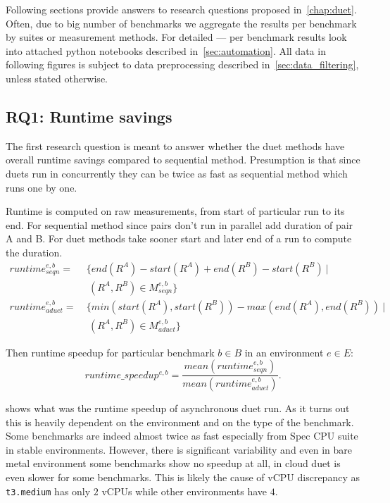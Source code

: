 Following sections provide answers to research questions proposed in~\cref{chap:duet}.
Often, due to big number of benchmarks we aggregate the results per benchmark by suites or measurement methods.
For detailed --- per benchmark results look into attached python notebooks described in~\cref{sec:automation}.
All data in following figures is subject to data preprocessing described in~\cref{sec:data_filtering}, unless stated otherwise.

\subsection{RQ1: Runtime savings}
\label{sec:rq1}

The first research question is meant to answer whether the duet methods have overall runtime savings compared to sequential method.
Presumption is that since duets run in concurrently they can be twice as fast as sequential method which runs one by one.

Runtime is computed on raw measurements, from start of particular run to its end. For sequential method since pairs don't run in parallel add duration of pair A and B.
For duet methods take sooner start and later end of a run to compute the duration.
\begin{align*}
runtime^{e, b}_{seqn}  =&~\{end(R^A) - start(R^A) + end(R^B) - start(R^B)~|\\
                        &~~(R^A, R^B) \in M^{e, b}_{seqn}\} \\
runtime^{e, b}_{aduet} =&~\{min(start(R^A), start(R^B)) - max(end(R^A), end(R^B))~|\\
                        &~~(R^A, R^B) \in M^{e, b}_{aduet}\}
\end{align*}

Then runtime speedup for particular benchmark $b \in B$ in an environment $e \in E$:
$$
runtime\_speedup^{e, b} = \frac{mean(runtime^{e, b}_{seqn})}{mean(runtime^{e, b}_{aduet})}.
$$

 shows what was the runtime speedup of asynchronous duet run.
As it turns out this is heavily dependent on the environment and on the type of the benchmark.
Some benchmarks are indeed almost twice as fast especially from Spec CPU suite in stable environments.
However, there is significant variability and even in bare metal environment some benchmarks show no speedup at all, in cloud duet is even slower for some benchmarks.
This is likely the cause of vCPU discrepancy as \lstinline{t3.medium} has only $2$ vCPUs while other environments have $4$.


